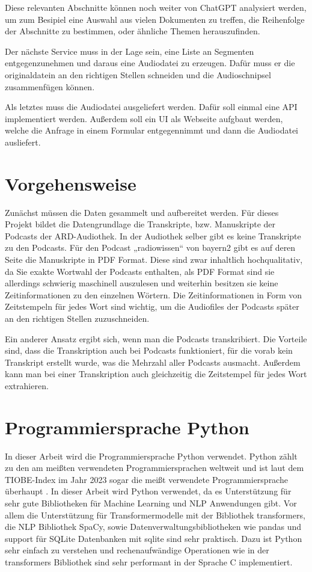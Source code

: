 Diese relevanten Abschnitte können noch weiter von ChatGPT analysiert werden, um zum Besipiel eine Auswahl aus vielen Dokumenten zu treffen, die Reihenfolge der Abschnitte zu bestimmen, oder ähnliche Themen herauszufinden.

Der nächste Service muss in der Lage sein, eine Liste an Segmenten entgegenzunehmen und daraus eine Audiodatei zu erzeugen.
Dafür muss er die originaldatein an den richtigen Stellen schneiden und die Audioschnipsel zusammenfügen können.

Als letztes muss die Audiodatei ausgeliefert werden. 
Dafür soll einmal eine API implementiert werden.
Außerdem soll ein UI als Webseite aufgbaut werden, welche die Anfrage in einem Formular entgegennimmt und dann die Audiodatei ausliefert.


\section{Vorgehensweise}


Zunächst müssen die Daten gesammelt und aufbereitet werden. 
Für dieses Projekt bildet die Datengrundlage die Transkripte, bzw. Manuskripte der Podcasts der ARD-Audiothek. 
In der Audiothek selber gibt es keine Transkripte zu den Podcasts. 
Für den Podcast „radiowissen“ von bayern2 gibt es auf deren Seite die Manuskripte in PDF Format. 
Diese sind zwar inhaltlich hochqualitativ, da Sie exakte Wortwahl der Podcasts enthalten, als PDF Format sind sie allerdings schwierig maschinell auszulesen und weiterhin besitzen sie keine Zeitinformationen zu den einzelnen Wörtern. 
Die Zeitinformationen in Form von Zeitstempeln für jedes Wort sind wichtig, um die Audiofiles der Podcasts später an den richtigen Stellen zuzuschneiden. 

Ein anderer Ansatz ergibt sich, wenn man die Podcasts transkribiert. 
Die Vorteile sind, dass die Transkription auch bei Podcasts funktioniert, für die vorab kein Transkript erstellt wurde, was die Mehrzahl aller Podcasts ausmacht. 
Außerdem kann man bei einer Transkription auch gleichzeitig die Zeitstempel für jedes Wort extrahieren.



\section{Programmiersprache Python}

In dieser Arbeit wird die Programmiersprache Python verwendet.
Python zählt zu den am meißten verwendeten Programmiersprachen weltweit und ist laut dem TIOBE-Index im Jahr 2023 sogar die meißt verwendete Programmiersprache überhaupt \cite{index2023}.
In dieser Arbeit wird Python verwendet, da es Unterstützung für sehr gute Bibliotheken für Machine Learning und NLP Anwendungen gibt.
Vor allem die Unterstützung für Transformermodelle mit der Bibliothek transformers, die NLP Bibliothek SpaCy, sowie Datenverwaltungsbibliotheken wie pandas und support für SQLite Datenbanken mit sqlite sind sehr praktisch.
Dazu ist Python sehr einfach zu verstehen und rechenaufwändige Operationen wie in der transformers Bibliothek sind sehr performant in der Sprache C implementiert.


